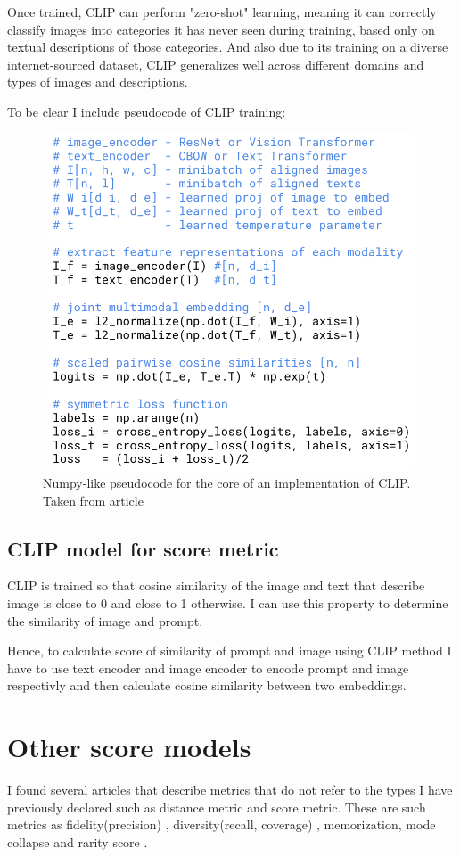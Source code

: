 Once trained, CLIP can perform "zero-shot" learning, meaning it can correctly classify images into categories it has never seen during training, based only on textual descriptions of those categories. And also due to its training on a diverse internet-sourced dataset, CLIP generalizes well across different domains and types of images and descriptions.


To be clear I include pseudocode of CLIP training:
\begin{figure}[hbt]
\centering
\includegraphics[width=12cm, height=10cm]{figs/clip_pseudocode.png}
\caption{Numpy-like pseudocode for the core of an implementation of CLIP. Taken from article\cite{CLIP}}
\label{fig:CLIP_pseudocode}
\end{figure}
\subsection{CLIP model for score metric}
CLIP  is trained so that cosine similarity of the image and text that describe image is close to 0 and close to 1 otherwise. I can use this property to determine the similarity of image and prompt. 

Hence, to calculate score of similarity of prompt and image using CLIP method I have to use text encoder and image encoder to encode prompt and image respectivly and then calculate cosine similarity between two embeddings.
\section{Other score models}
I found several articles \cite{DIffModels}\cite{PrecesionRecall}\cite{RarityScore} that describe metrics that do not refer to the types I have previously declared such as distance metric and score metric. These are such metrics as fidelity(precision) \cite{DIffModels}\cite{PrecesionRecall}, diversity(recall, coverage) \cite{DIffModels}\cite{PrecesionRecall}, memorization, mode collapse and rarity score \cite{RarityScore}.
